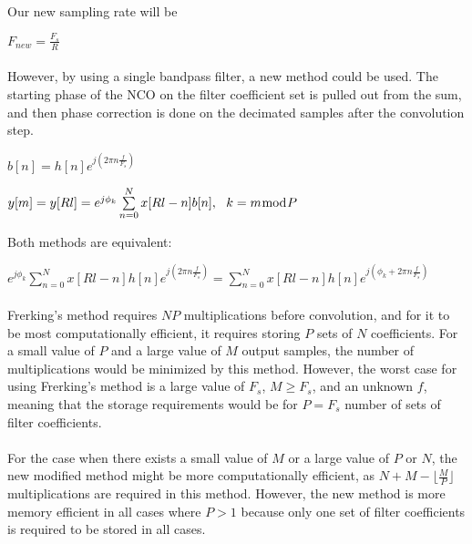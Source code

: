 \documentclass{article}
\begin{document}
        \paragraph{} 
        Our new sampling rate will be
        \begin{center}
            ${F}_{new} = \frac{{F}_{s}}{R}$
        \end{center}
        
        \paragraph{}    
        However, by using a single bandpass filter, a new method could be used. The starting phase of the NCO on the filter coefficient set is pulled out from the sum, and then phase correction is done on the decimated samples after the convolution step.
                
        \begin{center}
            ${{b}[n]} = h[n]e^{j({2{\pi}n\frac{f}{{F}_s}})} $
        \end{center}

        \begin{center}
            ${y[m]} = {y[Rl]} = e^{j{\phi}_k} \sum\limits_{n=0}^N x[Rl-n]{b[n]},\ \ k = m{\bmod}P $
        \end{center} 
        Both methods are equivalent:
        \begin{center}   
            $e^{j{\phi}_k} \sum\limits_{n=0}^N x[Rl-n]h[n]e^{j(2{\pi}n\frac{f}{{F}_s})} = \sum\limits_{n=0}^N x[Rl-n]h[n]e^{j({\phi}_k + 2{\pi}n\frac{f}{{F}_s})} $
        \end{center}
        
        \paragraph{}
        
        Frerking's method requires $NP$ multiplications before convolution, and for it to be most computationally efficient, it requires storing $P$ sets of $N$ coefficients. For a small value of $P$ and a large value of $M$ output samples, the number of multiplications would be minimized by this method. However, the worst case for using Frerking's method is a large value of ${F}_s$, $M \ge {F}_s$, and an unknown $f$, meaning that the storage requirements would be for $P = {F}_s$ number of sets of filter coefficients.
        \paragraph{}
        For the case when there exists a small value of $M$ or a large value of $P$ or $N$, the new modified method might be more computationally efficient, as $N + M - \lfloor {\frac{M}{P}} \rfloor $ multiplications are required in this method. However, the new method is more memory efficient in all cases where $P > 1$ because only one set of filter coefficients is required to be stored in all cases.
\end{document}
